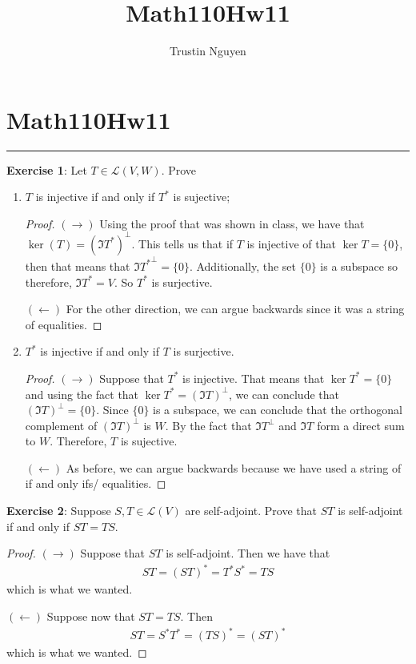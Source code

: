 \documentclass{article}
\title{Math110Hw11}
\author{Trustin Nguyen}
\begin{document}
\maketitle

\section*{Math110Hw11}
\hrule
\textbf{Exercise 1}: Let $T \in \mathcal{L}(V, W)$. Prove 
\begin{enumerate}
	\item $T$ is injective if and only if $T^{*}$ is sujective;
		\begin{proof}
			$(\rightarrow)$ Using the proof that was shown in class, we have that $\ker(T) = (\Im{T^{*}})^{\perp}$. This tells us that if $T$ is injective of that $\ker{T} = \{0\}$, then that means that $\Im{T^{*}}^{\perp} = \{0\}$. Additionally, the set $\{0\}$ is a subspace so therefore, $\Im{T^{*}} = V$. So $T^{*}$ is surjective.

			$(\leftarrow)$ For the other direction, we can argue backwards since it was a string of equalities.
		\end{proof}
	\item $T^{*}$ is injective if and only if $T$ is surjective. 
		\begin{proof}
			$(\rightarrow)$ Suppose that $T^{*}$ is injective. That means that $\ker{T^{*}} = \{0\}$ and using the fact that $\ker{T^{*}} = (\Im{T})^{\perp}$, we can conclude that $(\Im{T})^{\perp} = \{0\}$. Since $\{0\}$ is a subspace, we can conclude that the orthogonal complement of $(\Im{T})^{\perp}$ is $W$. By the fact that $\Im{T}^{\perp}$ and $\Im{T}$ form a direct sum to $W$. Therefore, $T$ is sujective.

			$(\leftarrow)$ As before, we can argue backwards because we have used a string of if and only ifs/ equalities.
		\end{proof}
\end{enumerate}

\textbf{Exercise 2}: Suppose $S, T \in \mathcal{L}(V)$ are self-adjoint. Prove that $ST$ is self-adjoint if and only if $ST = TS$.

\begin{proof}
	$(\rightarrow)$ Suppose that $ST$ is self-adjoint. Then we have that 
	\begin{align*}
		ST = (ST)^{*} = T^{*}S^{*} = TS
	\end{align*}
	which is what we wanted. 

	$(\leftarrow)$ Suppose now that $ST = TS$. Then 
	\begin{align*}
		ST = S^{*}T^{*} = (TS)^{*} = (ST)^{*}
	\end{align*}
	which is what we wanted.
\end{proof}
\end{document}
